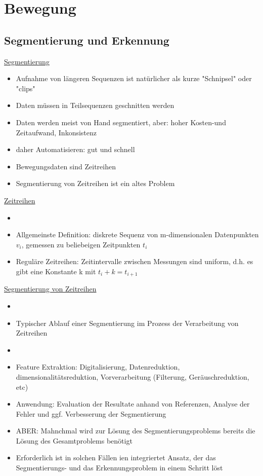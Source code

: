\documentclass[a4paper,10pt,oneside]{article}
\begin{document}
\section{Bewegung}
\subsection{Segmentierung und Erkennung}
 		
\underline{Segmentierung} \\	
	\begin{itemize}
		\item Aufnahme von längeren Sequenzen ist natürlicher als kurze "Schnipsel" oder "clips"
		\item Daten müssen in Teilsequenzen geschnitten werden
		\item Daten werden meist von Hand segmentiert, aber: hoher Kosten-und Zeitaufwand, Inkonsistenz
		\item daher Automatisieren: gut und schnell
		\item Bewegungsdaten sind Zeitreihen
		\item Segmentierung von Zeitreihen ist ein altes Problem
	\end{itemize}

\underline{Zeitreihen} \\
	\begin{itemize}
		\item[] %
		\item Allgemeinste Definition: diskrete Sequenz von m-dimensionalen Datenpunkten $v_i$, gemessen zu beliebeigen Zeitpunkten $t_i$
		\item Reguläre Zeitreihen: Zeitintervalle zwischen Messungen sind uniform, d.h. es gibt eine Konstante k mit $t_i +k = t_{i+1}$
	\end{itemize}
	
\underline{Segmentierung von Zeitreihen} \\
	\begin{itemize}
		\item[] %
		\item Typischer Ablauf einer Segmentierung im Prozess der Verarbeitung von Zeitreihen
		\item[] %
		\item Feature Extraktion: Digitalisierung, Datenreduktion, dimensionalitätsreduktion, Vorverarbeitung (Filterung, Geräuschreduktion, etc)
		\item Anwendung: Evaluation der Resultate anhand von Referenzen, Analyse der Fehler und ggf. Verbesserung der Segmentierung
		\item ABER: Mahnchmal wird zur Lösung des Segmentierungsproblems bereits die Lösung des Gesamtproblems benötigt
		\item Erforderlich ist in solchen Fällen ien integriertet Ansatz, der das Segmentierungs- und das Erkennungsproblem in einem Schritt löst
	\end{itemize}
\end{document}
